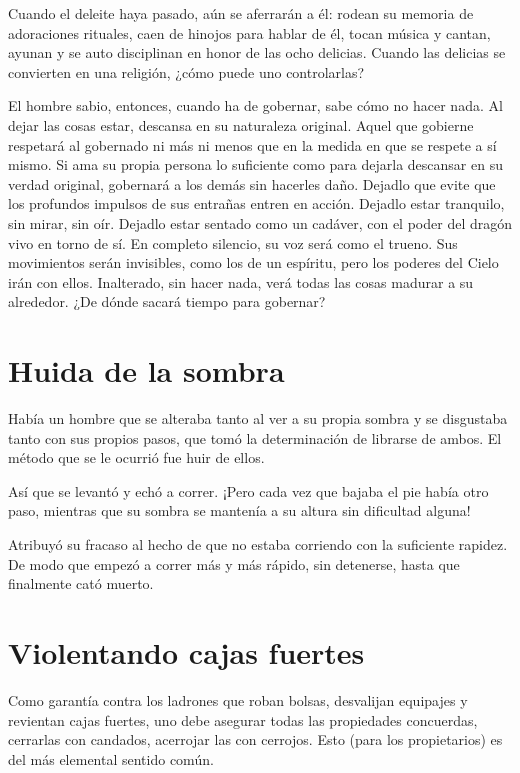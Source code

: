 \documentclass[book,b5paper,hidelinks,final]{memoir}
\begin{document}
	Cuando el deleite haya pasado, aún se aferrarán a él: rodean su memoria
	de adoraciones rituales, caen de hinojos para hablar de él, tocan música
	y cantan, ayunan y se auto disciplinan en honor de las ocho delicias.
	Cuando las delicias se convierten en una religión, ¿cómo puede uno
	controlarlas?
	
	El hombre sabio, entonces, cuando ha de gobernar, sabe cómo no hacer
	nada. Al dejar las cosas estar, descansa en su naturaleza original.
	Aquel que gobierne respetará al gobernado ni más ni menos que en la
	medida en que se respete a sí mismo. Si ama su propia persona lo
	suficiente como para dejarla descansar en su verdad original, gobernará
	a los demás sin hacerles daño. Dejadlo que evite que los profundos
	impulsos de sus entrañas entren en acción. Dejadlo estar tranquilo, sin
	mirar, sin oír. Dejadlo estar sentado como un cadáver, con el poder del
	dragón vivo en torno de sí. En completo silencio, su voz será como el
	trueno. Sus movimientos serán invisibles, como los de un espíritu, pero
	los poderes del Cielo irán con ellos. Inalterado, sin hacer nada, verá
	todas las cosas madurar a su alrededor. ¿De dónde sacará tiempo para
	gobernar?
	
	\chapter*{Huida de la sombra}
	
	Había un hombre que se alteraba tanto al ver a su propia sombra y se
	disgustaba tanto con sus propios pasos, que tomó la determinación de
	librarse de ambos. El método que se le ocurrió fue huir de ellos.
	
	Así que se levantó y echó a correr. ¡Pero cada vez que bajaba el pie
	había otro paso, mientras que su sombra se mantenía a su altura sin
	dificultad alguna!
	
	Atribuyó su fracaso al hecho de que no estaba corriendo con la
	suficiente rapidez. De modo que empezó a correr más y más rápido, sin
	detenerse, hasta que finalmente cató muerto.
	
	\chapter*{Violentando cajas fuertes}
	
	Como garantía contra los ladrones que roban bolsas, desvalijan equipajes
	y revientan cajas fuertes, uno debe asegurar todas las propiedades
	concuerdas, cerrarlas con candados, acerrojar las con cerrojos. Esto
	(para los propietarios) es del más elemental sentido común.
	
\end{document}
